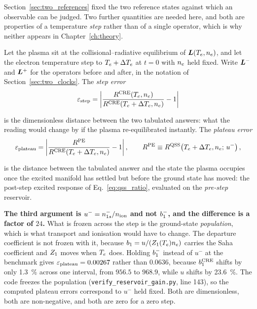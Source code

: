 Section~\ref{sec:two_references} fixed the two reference states against which an
observable can be judged. Two further quantities are needed here, and both are
properties of a temperature \emph{step} rather than of a single operator, which
is why neither appears in Chapter~\ref{ch:theory}.

Let the plasma sit at the collisional--radiative equilibrium of
$\bm{L}(T_e,n_e)$, and let the electron temperature step to $T_e+\Delta T_e$ at
$t=0$ with $n_e$ held fixed. Write $\bm{L}^-$ and $\bm{L}^+$ for the operators
before and after, in the notation of Section~\ref{sec:two_clocks}. The
\emph{step error}
\begin{equation}
  \varepsilon_{\mathrm{step}} = \left|\frac{R^{\mathrm{CRE}}(T_e,n_e)}
                        {R^{\mathrm{CRE}}(T_e+\Delta T_e,n_e)} - 1\right|
  \label{eq:eps_step_def}
\end{equation}

\noindent is the dimensionless distance between the two tabulated answers: what
the reading would change by if the plasma re-equilibrated instantly. The
\emph{plateau error}
\begin{equation}
  \varepsilon_{\mathrm{plateau}} = \left|\frac{R^{\mathrm{PE}}}
                        {R^{\mathrm{CRE}}(T_e+\Delta T_e,n_e)} - 1\right|,
  \qquad
  R^{\mathrm{PE}} \equiv R^{\mathrm{QSS}}\!\left(T_e+\Delta T_e,n_e;\,u^-\right),
  \label{eq:eps_plateau_def}
\end{equation}

\noindent is the distance between the tabulated answer and the state the plasma
occupies once the excited manifold has settled but before the ground state has
moved: the post-step excited response of Eq.~\eqref{eq:qss_ratio}, evaluated on
the \emph{pre-step} reservoir.

\textbf{The third argument is $u^- = n_{1s}^-/n_{\mathrm{ion}}$ and not $b_1^-$, and the
difference is a factor of $24$.} What is frozen across the step is the
ground-state \emph{population}, which is what transport and ionisation would
have to change. The departure coefficient is not frozen with it, because
$b_1 = u/(Z_{1}(T_e)n_e)$ carries the Saha coefficient and $Z_{1}$ moves
when $T_e$ does. Holding $b_1^-$ instead of $u^-$ at the benchmark gives
$\varepsilon_{\mathrm{plateau}} = 0.00267$ rather than $0.0636$, because $b_1^{\mathrm{CRE}}$ shifts
by only \SI{1.3}{\percent} across one interval, from $956.5$ to $968.9$, while
$u$ shifts by \SI{23.6}{\percent}. The code freezes the population
(\texttt{verify\_reservoir\_gain.py}, line 143), so the computed plateau
errors correspond to $u^-$ held fixed. Both are dimensionless, both are non-negative,
and both are zero for a zero step.

